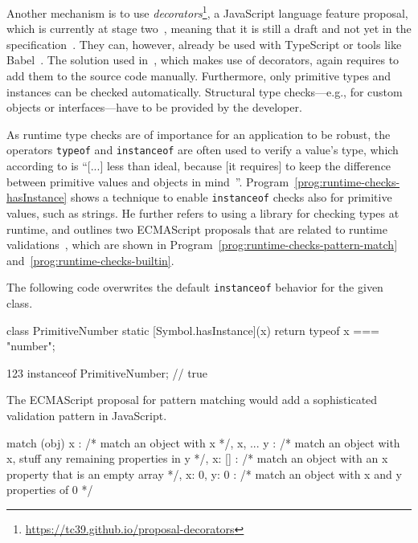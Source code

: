 Another mechanism is to use \textit{decorators}\footnote{\url{https://tc39.github.io/proposal-decorators}},
a JavaScript language feature proposal, which is currently at stage two~\cite{DecoratorsProposalRepo}, meaning that it is still a draft and not yet in the specification~\cite{EcmaScriptProposalProcess}. They can, however, already be used with TypeScript or tools like Babel~\cite{TypeScriptHandbook:Decorators, Babel:Plugins:Decorators}.
The solution used in~\cite{DecoratorTypeChecks}, which makes use of decorators, again requires
to add them to the source code manually. Furthermore, only primitive types and instances can be checked automatically. Structural type checks---e.g., for custom objects or interfaces---have
to be provided by the developer.

As runtime type checks are of importance for an application to be robust, the operators \texttt{typeof} and \texttt{instanceof} are often used to verify a value's type, which according to \citeauthor{DynamicTypeChecks:Rauschmayer:2017} is ``[...] less than ideal, because [it requires] to keep the difference between primitive values and objects in mind~\cite{DynamicTypeChecks:Rauschmayer:2017}''. Program~\ref{prog:runtime-checks-hasInstance} shows a technique to enable \texttt{instanceof} checks also for primitive values, such as strings. He further refers to using a library for checking types at runtime, and outlines two ECMAScript proposals that are related to runtime validations~\cite{DynamicTypeChecks:Rauschmayer:2017}, which are shown in Program~\ref{prog:runtime-checks-pattern-match} and~\ref{prog:runtime-checks-builtin}.

\begin{program}
\caption{The following code overwrites the default \texttt{instanceof} behavior for the given class.~\cites{DynamicTypeChecks:Rauschmayer:2017, DynamicTypeChecks:hasInstance}}
\label{prog:runtime-checks-hasInstance}
\begin{JsCode}
class PrimitiveNumber {
  static [Symbol.hasInstance](x) {
    return typeof x === "number";
  }
}

123 instanceof PrimitiveNumber; // true
\end{JsCode}
\end{program}

\begin{program}
\caption{The ECMAScript proposal for pattern matching would add a sophisticated validation pattern in JavaScript.~\cites{DynamicTypeChecks:Rauschmayer:2017, PatternMatchingProposalRepo}}
\label{prog:runtime-checks-pattern-match}
\begin{JsCode}
match (obj) {
  { x }: /* match an object with x */,
  { x, ... y }: /* match an object with x, stuff any remaining properties in y */,
  { x: [] }: /* match an object with an x property that is an empty array */,
  { x: 0, y: 0 }: /* match an object with x and y properties of 0 */
}
\end{JsCode}
\end{program}

